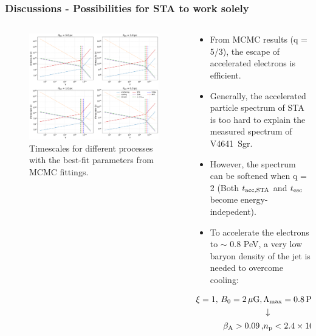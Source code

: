 \documentclass[10pt,aspectratio=169,mathserif]{beamer}
\begin{document}
\begin{frame}
  \frametitle{Discussions - Possibilities for STA to work solely}
	\begin{columns}[T] %
    \begin{column}{0.5\textwidth} 
      \begin{figure}
        \includegraphics[width=\textwidth]{Tscales_all.pdf}
        \caption{Timescales for different processes with the best-fit parameters from MCMC fittings.}
        \label{fig:confine}
      \end{figure}
    \end{column}
    \begin{column}{0.5\textwidth} 
    \begin{itemize}
        \item From MCMC results (q = 5/3), the escape of accelerated electrons is efficient.
        \item Generally, the accelerated particle spectrum of STA is too hard to explain the measured spectrum of V4641~Sgr.
        \item However, the spectrum can be softened when q = 2 (Both $t_{\rm acc,STA}$ and $t_{\rm esc}$ become energy-indepedent).
        \item To accelerate the electrons to $\sim$ 0.8 PeV, a very low baryon density of the jet is needed to overcome cooling:
    \end{itemize}
    \vspace{-9pt}
    \begin{align*}
        \xi = 1,\, B_0=2\,\rm \mu\text{G},\, &\Lambda_{\rm max}=0.8\,{\rm PeV}/\left(eB_0\right) \\
        &\downarrow\\
        \vspace{-8pt}
        \beta_{\rm A}>0.09\, , &n_{\rm p}<2.4\times 10^{-8}\,\rm cm^{-3}
    \end{align*}
        
    \end{column}
\end{columns}
\end{frame}
\end{document}
